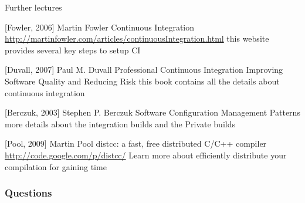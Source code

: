 \documentclass{beamer}
\begin{document}
\begin{frame}{Further lectures}
\begin{thebibliography}{8}

[Fowler, 2006]
	Martin Fowler
	\newblock Continuous Integration
	\url{http://martinfowler.com/articles/continuousIntegration.html}
	\newblock this website provides several key steps to setup CI

[Duvall, 2007]
	Paul M. Duvall
	\newblock Professional Continuous Integration Improving Software Quality and
	Reducing Risk
	\newblock this book contains all the details about continuous integration

[Berczuk, 2003]
	Stephen P. Berczuk
	\newblock Software Configuration Management Patterns
	\newblock more details about the integration builds and the Private builds
	
[Pool, 2009]
	Martin Pool
	\newblock distcc: a fast, free distributed C/C++ compiler
	\url{http://code.google.com/p/distcc/}
	\newblock Learn more about efficiently distribute your compilation for gaining
	time

\end{thebibliography}
\end{frame}

\begin{frame}
\frametitle{Questions}
\end{frame}
\end{document}
